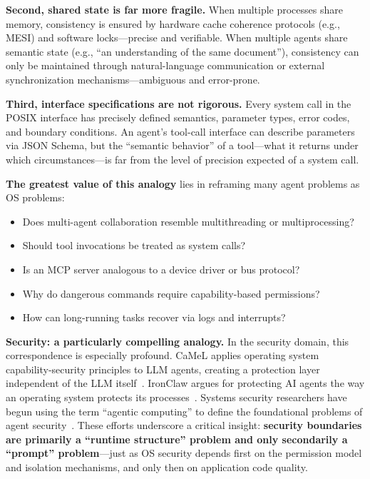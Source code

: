 \documentclass[11pt,a4paper]{article}
\begin{document}
\textbf{Second, shared state is far more fragile.}
When multiple processes share memory, consistency is ensured by hardware cache coherence protocols (e.g., MESI) and software locks---precise and verifiable.
When multiple agents share semantic state (e.g., ``an understanding of the same document''), consistency can only be maintained through natural-language communication or external synchronization mechanisms---ambiguous and error-prone.

\textbf{Third, interface specifications are not rigorous.}
Every system call in the POSIX interface has precisely defined semantics, parameter types, error codes, and boundary conditions.
An agent's tool-call interface can describe parameters via JSON Schema, but the ``semantic behavior'' of a tool---what it returns under which circumstances---is far from the level of precision expected of a system call.

\textbf{The greatest value of this analogy} lies in reframing many agent problems as OS problems:
\begin{itemize}[nosep]
\item Does multi-agent collaboration resemble multithreading or multiprocessing?~\cite{wu2023autogen}
\item Should tool invocations be treated as system calls?
\item Is an MCP server analogous to a device driver or bus protocol?~\cite{mcp_intro_2026}
\item Why do dangerous commands require capability-based permissions?~\cite{debenedetti2025camel}
\item How can long-running tasks recover via logs and interrupts?~\cite{openai_codex_approvals_2026}
\end{itemize}

\textbf{Security: a particularly compelling analogy.}
In the security domain, this correspondence is especially profound.
CaMeL applies operating system capability-security principles to LLM agents, creating a protection layer independent of the LLM itself~\cite{debenedetti2025camel}.
IronClaw argues for protecting AI agents the way an operating system protects its processes~\cite{ironclaw2025}.
Systems security researchers have begun using the term ``agentic computing'' to define the foundational problems of agent security~\cite{agenticsecurity2025}.
These efforts underscore a critical insight: \textbf{security boundaries are primarily a ``runtime structure'' problem and only secondarily a ``prompt'' problem}---just as OS security depends first on the permission model and isolation mechanisms, and only then on application code quality.
\end{document}
